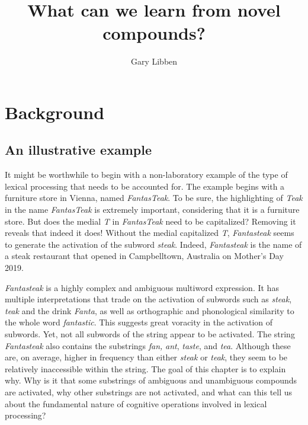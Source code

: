 \documentclass[output=paper]{langsci/langscibook}
\title{What can we learn from novel compounds?}
\author{Gary Libben\affiliation{Brock University}}
\begin{document}
\maketitle

\section{Background}\label{sec:libben:1}

\subsection{An illustrative example}\label{sec:libben:1.1}

It might be worthwhile to begin with a non-laboratory example of the type of lexical processing that needs to be accounted for.   The example begins with a furniture store in Vienna, named \textit{FantasTeak}.  To be sure, the highlighting of \textit{Teak} in the name \textit{FantasTeak} is extremely important, considering that it is a furniture store. But does the medial \textit{T} in \textit{FantasTeak} need to be capitalized?  Removing it reveals that indeed it does!  Without the medial capitalized \textit{T}, \textit{Fantasteak} seems to generate the activation of the subword \textit{steak}. Indeed, \textit{Fantasteak} is the name of a steak restaurant that opened in Campbelltown, Australia on Mother’s Day 2019. 

\textit{Fantasteak} is a highly complex and ambiguous multiword expression. It has multiple interpretations that trade on the activation of subwords such as \textit{steak}, \textit{teak} and the drink \textit{Fanta}, as well as orthographic and phonological similarity to the whole word \textit{fantastic}.  This suggests great voracity in the activation of subwords. Yet, not all subwords of the string appear to be activated. The string \textit{Fantasteak} also contains the substrings \textit{fan,} \textit{ant}, \textit{taste}, and \textit{tea}.  Although these are, on average, higher in frequency than either \textit{steak} or \textit{teak}, they seem to be relatively inaccessible within the string. The goal of this chapter is to explain why.  Why is it that some substrings of ambiguous and unambiguous compounds are activated, why other substrings are not activated, and what can this tell us about the fundamental nature of cognitive operations involved in lexical processing?
\end{document}
